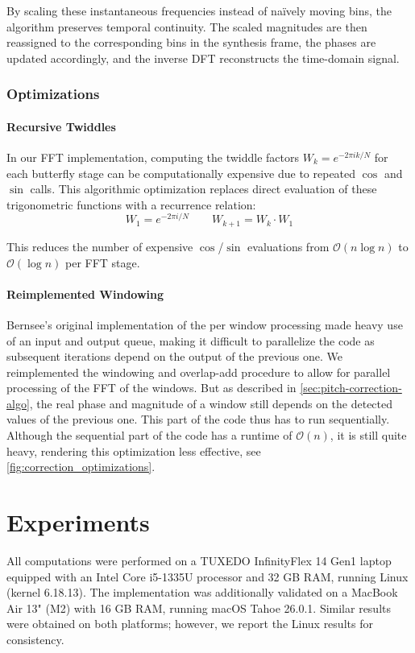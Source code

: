 \documentclass[sigconf]{acmart}
\begin{document}
    By scaling these instantaneous frequencies instead of naïvely moving bins, the algorithm preserves temporal continuity. The scaled magnitudes are then reassigned to the corresponding bins in the synthesis frame, the phases are updated accordingly, and the inverse DFT reconstructs the time-domain signal.

    \subsubsection{Optimizations}
    \paragraph{Recursive Twiddles} In our FFT implementation, computing the twiddle factors
    $W_k = e^{-2 \pi i k / N}$ for each butterfly stage can be
    computationally expensive due to repeated $\cos$ and $\sin$ calls. This algorithmic optimization replaces direct evaluation of these trigonometric functions with a recurrence relation:
    $$
    W_1 = e^{-2 \pi i / N} \qquad W_{k+1} = W_k \cdot W_1
    $$

    This reduces the number of expensive $\cos$/$\sin$ evaluations from
    $\mathcal O(n \log n)$ to $\mathcal O(\log n)$ per FFT stage.

    \paragraph{Reimplemented Windowing} Bernsee's original implementation of the per window processing made heavy use of an input and output queue, making it difficult to parallelize the code as subsequent iterations depend on the output of the previous one. We reimplemented the windowing and overlap-add procedure to allow for parallel processing of the FFT of the windows. But as described in \ref{sec:pitch-correction-algo}, the real phase and magnitude of a window still depends on the detected values of the previous one. This part of the code thus has to run sequentially. Although the sequential part of the code has a runtime of $\mathcal{O}(n)$, it is still quite heavy, rendering this optimization less effective, see \autoref{fig:correction_optimizations}.

    \section{Experiments}
    All computations were performed on a TUXEDO InfinityFlex 14 Gen1 laptop equipped with an Intel Core i5-1335U processor and 32 GB RAM, running Linux (kernel 6.18.13). The implementation was additionally validated on a MacBook Air 13" (M2) with 16 GB RAM, running macOS Tahoe 26.0.1. Similar results were obtained on both platforms; however, we report the Linux results for consistency.
\end{document}
